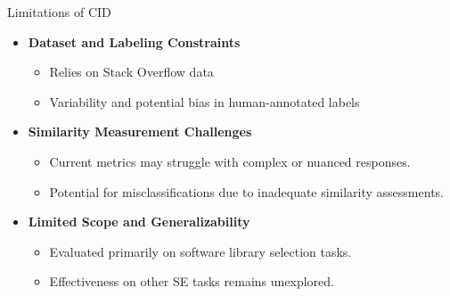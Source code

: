 \begin{frame}{Limitations of CID}
  \begin{itemize}
      \item \textbf{Dataset and Labeling Constraints}
      \begin{itemize}
          \item Relies on Stack Overflow data
          \item Variability and potential bias in human-annotated labels
      \end{itemize}
      
      \item \textbf{Similarity Measurement Challenges}
      \begin{itemize}
          \item Current metrics may struggle with complex or nuanced responses.
          \item Potential for misclassifications due to inadequate similarity assessments.
      \end{itemize}
      
      \item \textbf{Limited Scope and Generalizability}
      \begin{itemize}
          \item Evaluated primarily on software library selection tasks.
          \item Effectiveness on other SE tasks remains unexplored.
      \end{itemize}
  \end{itemize}
\end{frame}



    
